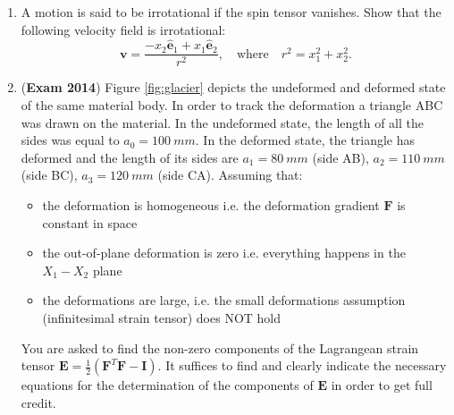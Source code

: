 \documentclass{article}
\newcommand{\ee}{\end{equation}}
\newcommand{\be}{\begin{equation}}
\newcommand{\bi}{\begin{itemize}}
\newcommand{\ei}{\end{itemize}}
\newcommand{\bs}{\boldsymbol}
\newcommand{\tm}{\textrm}
\newif\ifsolution
\begin{document}
\begin{enumerate}
\item A motion is said to be irrotational if the spin tensor vanishes. Show that the following velocity field is
irrotational:
\be
\bs{v}=\frac{-x_2 \bs{\hat{e}}_1+x_1\bs{\hat{e}}_2 }{r^2}, \quad \tm{where} \quad r^2 = x_1^2+x_2^2.
\ee

\ifsolution
\underline{Solution:}

The spin tensor $\bs{W}$ is defined as:
\be
\bs{W}=\frac{1}{2}( \nabla \bs{v}-(\nabla \bs{v})^T)
\ee
where $\nabla \bs{v}$ is the velocity gradient (spatial description).
From the velocity field above we have that:
\be
[\bs{v}]=\frac{1}{r^4}\left[\begin{array}{lll}   2x_1x_2 & x_2^2-x_1^2 & 0 \\
                             x_2^2-x_1^2 &-2x_1x_2 & 0 \\ 0 & 0 & 0
                            \end{array}\right]
\ee
from which one can easily verify that:
\be
\bs{W}=\bs{0}.
\ee
\fi

\newpage
\item (\textbf{Exam 2014})  Figure \ref{fig:glacier} depicts the undeformed and deformed state of the same material
body. In order to track the deformation a triangle ABC was drawn on the material. In the undeformed state, the length
of all the sides was equal to $a_0=100~mm$. In the deformed state, the triangle has deformed and the length of its
sides are $a_1=80~mm$ (side AB), $a_2=110~mm$ (side BC), $a_3=120~mm$ (side CA).
Assuming that:
\bi
\item the deformation is homogeneous i.e. the deformation gradient $\bs{F}$ is constant in space
\item the out-of-plane deformation is zero i.e. everything happens in the $X_1-X_2$ plane
\item the deformations are large, i.e. the small deformations assumption (infinitesimal strain tensor) does NOT hold
\ei
You are asked to find the non-zero components of the Lagrangean strain tensor $\bs{E}=\frac{1}{2}(\bs{F}^T
\bs{F}-\bs{I})$.  It suffices to find and clearly indicate the necessary equations for the determination of the
components of $\bs{E}$ in order to get full credit.

\begin{figure}[!h]


\end{figure}
\end{enumerate}
\end{document}
